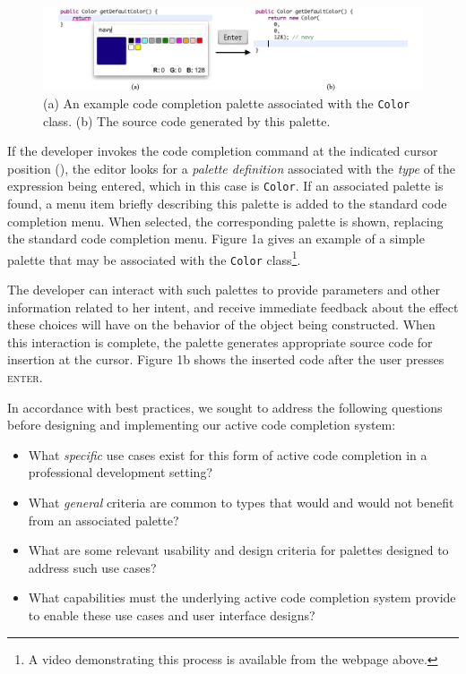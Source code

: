 \documentclass[10pt, conference, compsocconf]{IEEEtran}
\begin{document}
\begin{figure}\label{color}
\begin{center}
\includegraphics[width=\textwidth]{color_palette.png}\end{center}
\caption{(a) An example code completion palette associated with the \texttt{Color} class. (b) The source code generated by this palette.}
\end{figure}

If the developer invokes the code completion command at the indicated cursor position (\textvisiblespace), the editor  looks  for a {\it palette definition} associated with the {\it type} of the expression being entered, which in this case is  \verb|Color|. If an associated palette is found, a menu item briefly describing this palette is added to the standard code completion menu. When selected, the corresponding palette is shown, replacing the standard code completion menu. Figure 1a gives an example of a simple palette that may be associated with the \verb|Color| class\footnote{A video demonstrating this process is available from the webpage above.}. 

The developer can interact with such palettes to provide parameters and other information related to her intent, and receive immediate feedback about the effect these choices will have on the behavior of the object being constructed. When this interaction is complete, the palette generates appropriate source code for insertion at the cursor. Figure 1b shows the inserted code after the user presses \textsc{enter}.

In accordance with best practices, we sought to address the following questions before designing and implementing our active code completion system:

\begin{itemize}
\item What {\it specific} use cases exist for this form of active code completion in a professional development setting? 
\item What {\it general} criteria are common to types that would and would not benefit from an associated palette?
\item What are some relevant usability and design criteria for palettes designed to address such use cases?
\item What capabilities must the underlying active code completion system provide to enable these use cases and user interface designs?
\end{itemize}
\end{document}
